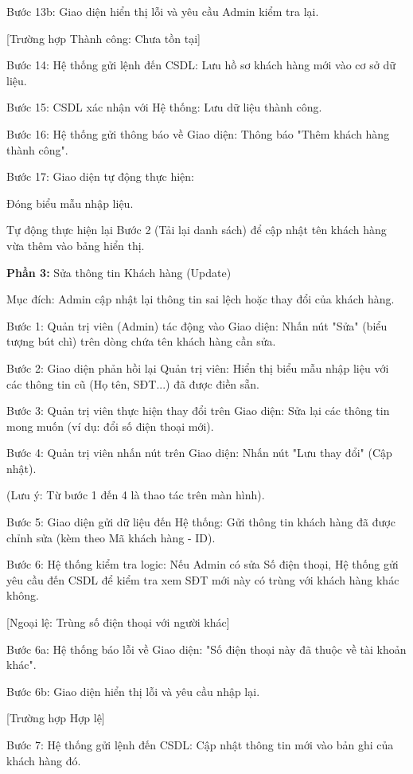\documentclass[../BTL.tex]{subfiles}
\begin{document}
Bước 13b: Giao diện hiển thị lỗi và yêu cầu Admin kiểm tra lại.

{[}Trường hợp Thành công: Chưa tồn tại{]}

Bước 14: Hệ thống gửi lệnh đến CSDL: Lưu hồ sơ khách hàng mới vào cơ sở
dữ liệu.

Bước 15: CSDL xác nhận với Hệ thống: Lưu dữ liệu thành công.

Bước 16: Hệ thống gửi thông báo về Giao diện: Thông báo "Thêm khách hàng
thành công".

Bước 17: Giao diện tự động thực hiện:

Đóng biểu mẫu nhập liệu.

Tự động thực hiện lại Bước 2 (Tải lại danh sách) để cập nhật tên khách
hàng vừa thêm vào bảng hiển thị.

\textbf{Phần 3:} Sửa thông tin Khách hàng (Update)

Mục đích: Admin cập nhật lại thông tin sai lệch hoặc thay đổi của khách
hàng.

Bước 1: Quản trị viên (Admin) tác động vào Giao diện: Nhấn nút "Sửa"
(biểu tượng bút chì) trên dòng chứa tên khách hàng cần sửa.

Bước 2: Giao diện phản hồi lại Quản trị viên: Hiển thị biểu mẫu nhập
liệu với các thông tin cũ (Họ tên, SĐT...) đã được điền sẵn.

Bước 3: Quản trị viên thực hiện thay đổi trên Giao diện: Sửa lại các
thông tin mong muốn (ví dụ: đổi số điện thoại mới).

Bước 4: Quản trị viên nhấn nút trên Giao diện: Nhấn nút "Lưu thay đổi"
(Cập nhật).

(Lưu ý: Từ bước 1 đến 4 là thao tác trên màn hình).

Bước 5: Giao diện gửi dữ liệu đến Hệ thống: Gửi thông tin khách hàng đã
được chỉnh sửa (kèm theo Mã khách hàng - ID).

Bước 6: Hệ thống kiểm tra logic: Nếu Admin có sửa Số điện thoại, Hệ
thống gửi yêu cầu đến CSDL để kiểm tra xem SĐT mới này có trùng với
khách hàng khác không.

{[}Ngoại lệ: Trùng số điện thoại với người khác{]}

Bước 6a: Hệ thống báo lỗi về Giao diện: "Số điện thoại này đã thuộc về
tài khoản khác".

Bước 6b: Giao diện hiển thị lỗi và yêu cầu nhập lại.

{[}Trường hợp Hợp lệ{]}

Bước 7: Hệ thống gửi lệnh đến CSDL: Cập nhật thông tin mới vào bản ghi
của khách hàng đó.
\end{document}
